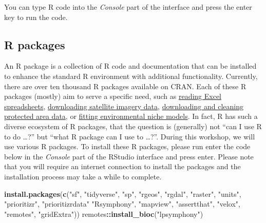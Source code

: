 \documentclass[12pt,]{book}
\newenvironment{Shaded}{\begin{snugshade}}{\end{snugshade}}
\newcommand{\KeywordTok}[1]{\textcolor[rgb]{0.13,0.29,0.53}{\textbf{#1}}}
\newcommand{\StringTok}[1]{\textcolor[rgb]{0.31,0.60,0.02}{#1}}
\newcommand{\OperatorTok}[1]{\textcolor[rgb]{0.81,0.36,0.00}{\textbf{#1}}}
\newcommand{\NormalTok}[1]{#1}
\begin{document}
You can type R code into the \emph{Console} part of the interface and
press the enter key to run the code.

\subsection{R packages}\label{r-packages}

An R package is a collection of R code and documentation that can be
installed to enhance the standard R environment with additional
functionality. Currently, there are over ten thousand R packages
available on CRAN. Each of these R packages (mostly) aim to serve a
specific need, such as
\href{https://cran.r-project.org/web/packages/readxl/index.html}{reading
Excel spreadsheets},
\href{https://cran.r-project.org/web/packages/MODIStsp/index.html}{downloading
satellite imagery data},
\href{https://cran.r-project.org/web/packages/wdpar/index.html}{downloading
and cleaning protected area data}, or
\href{https://cran.r-project.org/web/packages/ENMeval/index.html}{fitting
environmental niche models}. In fact, R has such a diverse ecosystem of
R packages, that the question is (generally) not ``can I use R to do
\ldots{}?'' but ``what R package can I use to \ldots{}?''. During this
workshop, we will use various R packages. To install these R packages,
please run enter the code below in the \emph{Console} part of the
RStudio interface and press enter. Please note that you will require an
internet connection to install the packages and the installation process
may take a while to complete.

\begin{Shaded}
\begin{Highlighting}[]
\KeywordTok{install.packages}\NormalTok{(}\KeywordTok{c}\NormalTok{(}\StringTok{"sf"}\NormalTok{, }\StringTok{"tidyverse"}\NormalTok{, }\StringTok{"sp"}\NormalTok{, }\StringTok{"rgeos"}\NormalTok{, }\StringTok{"rgdal"}\NormalTok{, }\StringTok{"raster"}\NormalTok{, }\StringTok{"units"}\NormalTok{,}
                   \StringTok{"prioritizr"}\NormalTok{, }\StringTok{"prioritizrdata"} \StringTok{"Rsymphony"}\NormalTok{, }\StringTok{"mapview"}\NormalTok{,}
                   \StringTok{"assertthat"}\NormalTok{, }\StringTok{"velox"}\NormalTok{, }\StringTok{"remotes"}\NormalTok{, }\StringTok{"gridExtra"}\NormalTok{))}
\NormalTok{remotes}\OperatorTok{::}\KeywordTok{install_bioc}\NormalTok{(}\StringTok{"lpsymphony"}\NormalTok{)}
\end{Highlighting}
\end{Shaded}
\end{document}
